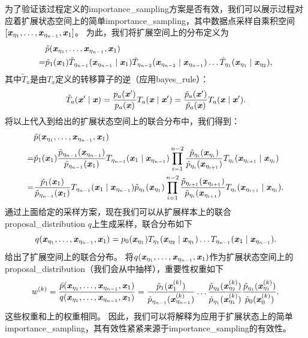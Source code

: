 为了验证该过程定义的\gls{importance_sampling}方案是否有效，我们可以展示\citep{Neal-2001}过程对应着扩展状态空间上的简单\gls{importance_sampling}，其中数据点采样自乘积空间$[\Vx_{\eta_1},\dots,\Vx_{\eta_{n-1}},\Vx_1]$。
为此，我们将扩展空间上的分布定义为
\begin{align}
&\tilde{p} (\Vx_{\eta_1}, \dots, \Vx_{\eta_{n-1}}, \Vx_1) \\
= &\tilde{p}_1 (\Vx_1) \tilde{T}_{\eta_{n-1}} (\Vx_{\eta_{n-1}} \mid \Vx_1)
 	\tilde{T}_{\eta_{n-2}}  (\Vx_{\eta_{n-2}} \mid \Vx_{\eta_{n-1}}) \dots
 	\tilde{T}_{\eta_1} (\Vx_{\eta_1} \mid \Vx_{\eta_2}) \label{eq:18.55} ,
\end{align}
其中$\tilde{T}_a$是由$T_a$定义的转移算子的逆（应用\gls{bayes_rule}）：
\begin{equation}
	\tilde{T}_a (\Vx' \mid \Vx) = \frac{p_a(\Vx')}{ p_a(\Vx) } T_a(\Vx \mid \Vx') = 
\frac{  \tilde{p}_a(\Vx')}{ \tilde{p}_a(\Vx) } T_a(\Vx \mid \Vx') .
\end{equation}
将以上代入到给出的扩展状态空间上的联合分布中，我们得到：
\begin{align}
	&\tilde{p} (\Vx_{\eta_1}, \dots, \Vx_{\eta_{n-1}}, \Vx_1) \\
	= &\tilde{p}_1 (\Vx_1) \frac{ \tilde{p}_{\eta_{n-1}} (\Vx_{\eta_{n-1}})  }{ \tilde{p}_{\eta_{n-1}}(\Vx_1)} T_{\eta_{n-1}} (\Vx_1 \mid \Vx_{\eta_{n-1}})
\prod_{i=1}^{n-2} \frac{ \tilde{p}_{\eta_i}(\Vx_{\eta_i}) }{ \tilde{p}_{\eta_i}(\Vx_{\eta_{i+1}})} T_{\eta_i} (\Vx_{\eta_{i+1}} \mid \Vx_{\eta_i}) \\
	= &\frac{ \tilde{p}_1(\Vx_1) }{ \tilde{p}_{\eta_{n-1}}(\Vx_1) } T_{\eta_{n-1}} (\Vx_1 \mid \Vx_{\eta_{n-1}})
\tilde{p}_{\eta_1} (\Vx_{\eta_1}) \prod_{i=1}^{n-2} \frac{ \tilde{p}_{\eta_{i+1}}(\Vx_{\eta_{i+1}}) }{ \tilde{p}_{\eta_i}(\Vx_{\eta_{i+1}}) } T_{\eta_i} (\Vx_{\eta_{i+1}} \mid \Vx_{\eta_i}) . \label{eq:18.59}
\end{align}
通过上面给定的采样方案，现在我们可以从扩展样本上的联合\gls{proposal_distribution} $q$上生成采样，联合分布如下
\begin{equation}
	q(\Vx_{\eta_1}, \dots, \Vx_{\eta_{n-1}}, \Vx_1)  = p_0(\Vx_{\eta_1}) T_{\eta_1}( \Vx_{\eta_2} \mid \Vx_{\eta_1} ) \dots T_{\eta_{n-1}} (\Vx_1 \mid \Vx_{\eta_{n-1}}) .
\end{equation}
给出了扩展空间上的联合分布。
将$q(\Vx_{\eta_1}, \dots, \Vx_{\eta_{n-1}}, \Vx_1)$作为扩展状态空间上的\gls{proposal_distribution}（我们会从中抽样），重要性权重如下
\begin{equation}
	w^{(k)} = \frac{ \tilde{p}(\Vx_{\eta_1}, \dots, \Vx_{\eta_{n-1}}, \Vx_1) }{ q( \Vx_{\eta_1}, \dots, \Vx_{\eta_{n-1}}, \Vx_1 ) } =
\frac{ \tilde{p}_1(\Vx_1^{(k)}) }{ \tilde{p}_{\eta_{n-1}}(\Vx_{\eta_{n-1}}^{(k)}) } \dots
\frac{ \tilde{p}_{\eta_{2}}(\Vx_{\eta_{2}}^{(k)}) }{ \tilde{p}_{\eta_1}(\Vx_{\eta_{1}}^{(k)}) } 
\frac{ \tilde{p}_{\eta_{1}}(\Vx_{\eta_{1}}^{(k)}) }{ \tilde{p}_{0}(\Vx_{0}^{(k)}) } .
\end{equation}
这些权重和上的权重相同。
因此，我们可以将解释为应用于扩展状态上的简单\gls{importance_sampling}，其有效性紧紧来源于\gls{importance_sampling}的有效性。

